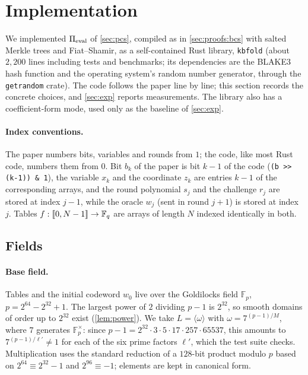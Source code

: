 \section{Implementation}\label{sec:impl}

We implemented $\Pi_{\mathrm{eval}}$ of \cref{sec:pcs}, compiled as in \cref{sec:proofs:bcs} with salted Merkle trees and Fiat--Shamir, as a self-contained Rust library, \texttt{kbfold} (about $2{,}200$ lines including tests and benchmarks; its dependencies are the BLAKE3 hash function and the operating system's random number generator, through the \texttt{getrandom} crate).
The code follows the paper line by line; this section records the concrete choices, and \cref{sec:exp} reports measurements.
The library also has a coefficient-form mode, used only as the baseline of \cref{sec:exp}.

\paragraph{Index conventions.}
The paper numbers bits, variables and rounds from $1$; the code, like most Rust code, numbers them from $0$.
Bit $b_k$ of the paper is bit $k-1$ of the code (\texttt{(b >> (k-1)) \& 1}), the variable $x_k$ and the coordinate $z_k$ are entries $k-1$ of the corresponding arrays, and the round polynomial $s_j$ and the challenge $r_j$ are stored at index $j-1$, while the oracle $w_j$ (sent in round $j+1$) is stored at index $j$.
Tables $f : \llbracket 0, N-1 \rrbracket \to \mathbb{F}_q$ are arrays of length $N$ indexed identically in both.

\subsection{Fields}\label{sec:impl:fields}

\paragraph{Base field.}
Tables and the initial codeword $w_0$ live over the Goldilocks field $\mathbb{F}_p$, $p = 2^{64} - 2^{32} + 1$.
The largest power of $2$ dividing $p - 1$ is $2^{32}$, so smooth domains of order up to $2^{32}$ exist (\cref{lem:power}).
We take $L = \langle \omega \rangle$ with $\omega = 7^{(p-1)/M}$, where $7$ generates $\mathbb{F}_p^{\times}$: since $p - 1 = 2^{32}\cdot 3 \cdot 5 \cdot 17 \cdot 257 \cdot 65537$, this amounts to $7^{(p-1)/\ell'} \ne 1$ for each of the six prime factors $\ell'$, which the test suite checks.
Multiplication uses the standard reduction of a $128$-bit product modulo $p$ based on $2^{64} \equiv 2^{32}-1$ and $2^{96} \equiv -1$; elements are kept in canonical form.

